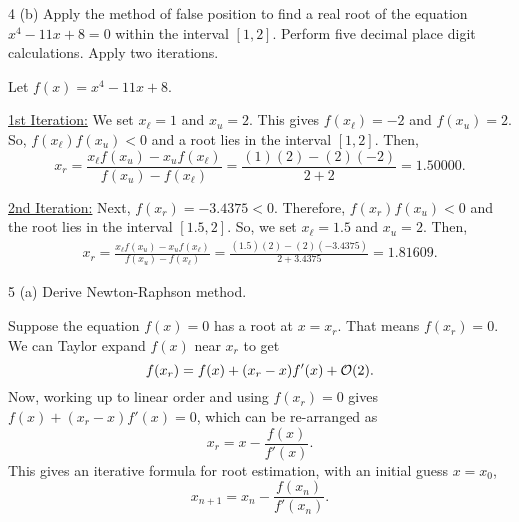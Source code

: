 \documentclass[11pt]{penrose}
\begin{document}
\begin{problem}{4 (b)}
    Apply the method of false position to find a real root of the equation $x^4 - 11x + 8 = 0$ within the interval $[1,2]$. Perform five decimal place digit calculations. Apply two iterations.

    \solution Let $f(x) = x^4 - 11x + 8$.

    \underline{1st Iteration:}
    We set $x_\ell = 1$ and $x_u = 2$. This gives $f(x_\ell) = -2$ and $f(x_u) = 2$. So, $f(x_\ell)f(x_u) < 0$ and a root lies in the interval $[1,2]$. Then,
    \begin{equation*}
        x_r = \frac{x_\ell f(x_u) - x_u f(x_\ell)}{f(x_u) - f(x_\ell)} = \frac{(1)(2) - (2)(-2)}{2 + 2} = 1.50000.
    \end{equation*}
    
    \underline{2nd Iteration:}
    Next, $f(x_r) = -3.4375 < 0$. Therefore, $f(x_r)f(x_u) < 0$ and the root lies in the interval $[1.5, 2]$. So, we set $x_\ell = 1.5$ and $x_u = 2$. Then,
    \begin{align*}
        x_r = \frac{x_\ell f(x_u) - x_u f(x_\ell)}{f(x_u) - f(x_\ell)} = \frac{(1.5)(2) - (2)(-3.4375)}{2 + 3.4375} = 1.81609.
    \end{align*}
\end{problem}

\begin{problem}{5 (a)}
    Derive Newton-Raphson method.

    \solution Suppose the equation $f(x) = 0$ has a root at $x = x_r$. That means $f(x_r) = 0$. We can Taylor expand $f(x)$ near $x_r$ to get
    \begin{equation*}
        f(x_r) = f(x) + (x_r - x) f'(x) + \mathcal{O}(2).
    \end{equation*}
    Now, working up to linear order and using $f(x_r) = 0$ gives $f(x) + (x_r - x) f'(x) = 0$, which can be re-arranged as
    \begin{equation*}
        x_r = x - \frac{f(x)}{f'(x)}.
    \end{equation*}
    This gives an iterative formula for root estimation, with an initial guess $x = x_0$,
    \begin{equation*}
        x_{n+1} = x_n - \frac{f(x_n)}{f'(x_n)}.
    \end{equation*}
\end{problem}
\end{document}
